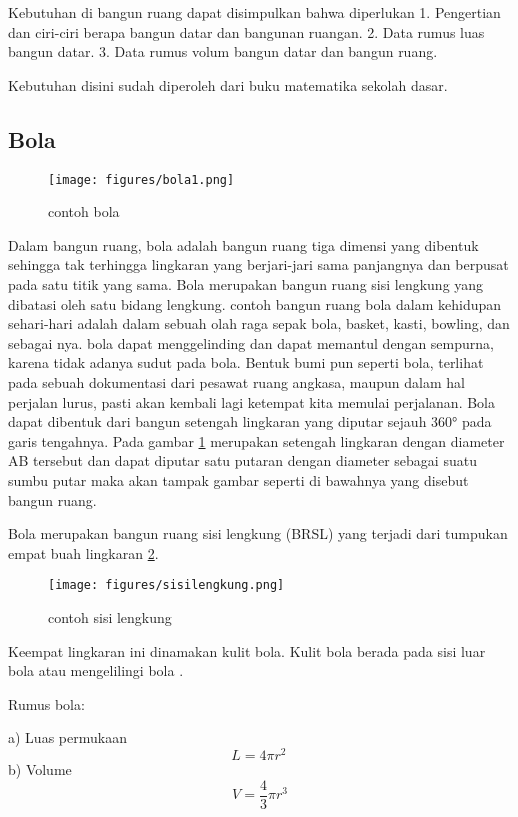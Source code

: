 Kebutuhan di bangun ruang dapat disimpulkan bahwa diperlukan 
1.    Pengertian dan ciri-ciri berapa bangun datar dan bangunan ruangan.
2.    Data rumus luas bangun datar.
3.    Data rumus volum bangun datar dan bangun ruang.

Kebutuhan disini sudah diperoleh dari buku matematika sekolah dasar.

\subsection{Bola} 

\begin{figure}[ht]
    \centering
	\texttt{[image: figures/bola1.png]}
    \caption{contoh bola}
    \label{bola1}
\end{figure}

Dalam bangun ruang, bola adalah bangun ruang tiga dimensi yang dibentuk sehingga tak terhingga lingkaran yang berjari-jari sama panjangnya dan berpusat pada satu titik yang sama. Bola merupakan bangun ruang sisi lengkung yang dibatasi oleh satu bidang lengkung.
contoh bangun ruang bola dalam kehidupan sehari-hari adalah dalam sebuah olah raga sepak bola, basket, kasti, bowling, dan sebagai nya. bola dapat menggelinding dan dapat memantul dengan sempurna, karena tidak adanya sudut pada bola. 
Bentuk bumi pun seperti bola, terlihat pada sebuah dokumentasi dari pesawat ruang angkasa, maupun dalam hal perjalan lurus, pasti akan kembali lagi ketempat kita memulai perjalanan.
Bola dapat dibentuk dari bangun setengah lingkaran yang diputar sejauh 360° pada garis tengahnya. 
Pada gambar  \ref{bola1} merupakan setengah lingkaran dengan diameter AB  tersebut dan dapat diputar satu putaran dengan diameter sebagai suatu sumbu putar maka akan tampak gambar seperti di bawahnya yang disebut bangun ruang.


Bola merupakan bangun ruang sisi lengkung (BRSL) yang terjadi dari tumpukan empat buah lingkaran \ref{sisilengkung}.
\begin{figure}[ht]
    \centering
\texttt{[image: figures/sisilengkung.png]}
    \caption{contoh sisi lengkung}
    \label{sisilengkung}
    \end{figure} 
Keempat lingkaran ini dinamakan kulit bola. Kulit bola berada pada sisi luar bola atau mengelilingi bola \cite{nurfarikhin2010hubungan}.

Rumus bola:

a) Luas permukaan
 \begin{equation}
     L = 4 \pi r^2 \,
\end{equation}
b) Volume
\begin{equation}
     V = \frac{4}{3}\pi r^3
\end{equation}
